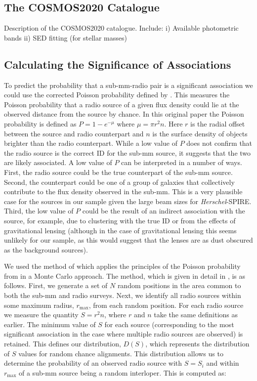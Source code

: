 \subsection{The COSMOS2020 Catalogue}

{\color{red}Description of the COSMOS2020 catalogue. Include: i) Available photometric bands ii) SED fitting (for stellar masses)}

\subsection{Calculating the Significance of Associations}
\label{sec:radio_significance}

To predict the probability that a sub-mm-radio pair is a significant association we could use the corrected Poisson probability defined by \citealt{Downes_1986}. This measures the Poisson probability that a radio source of a given flux density could lie at the observed distance from the source by chance. In this original paper the Poisson probability is defined as $P = 1-e^{-\mu}$ where $\mu = \pi r^2n$. Here $r$ is the radial offset between the source and radio counterpart and $n$ is the surface density of objects brighter than the radio counterpart. While a low value of $P$ does not confirm that the radio source is the correct ID for the sub-mm source, it suggests that the two are likely associated. A low value of $P$ can be interpreted in a number of ways. First, the radio source could be the true counterpart of the sub-mm source. Second, the counterpart could be one of a group of galaxies that collectively contribute to the flux density observed in the sub-mm. This is a very plausible case for the sources in our sample given the large beam sizes for \textit{Herschel}-SPIRE. Third, the low value of $P$ could be the result of an indirect association with the source, for example, due to clustering with the true ID or from the effects of gravitational lensing (although in the case of gravitational lensing this seems unlikely for our sample, as this would suggest that the lenses are as dust obscured as the background sources).

We used the method of \citealt{Lilly_1999} which applies the principles of the Poisson probability from \citealt{Downes_1986} in a Monte Carlo approach. The method, which is given in detail in \citealt{Dye_2009}, is as follows. First, we generate a set of $N$ random positions in the area common to both the sub-mm and radio surveys. Next, we identify all radio sources within some maximum radius, $r_{\textrm{max}}$, from each random position. For each radio source we measure the quantity $S = r^2n$, where $r$ and $n$ take the same definitions as earlier. The minimum value of $S$ for each source (corresponding to the most significant association in the case where multiple radio sources are observed) is retained. This defines our distribution, $D(S)$, which represents the distribution of $S$ values for random chance alignments. This distribution allows us to determine the probability of an observed radio source with $S = S_i$ and within $r_{\textrm{max}}$ of a sub-mm source being a random interloper. This is computed as:

